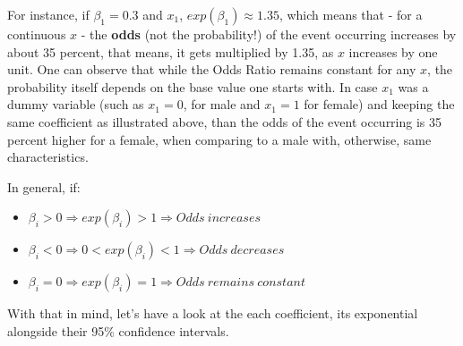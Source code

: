 \documentclass[12,]{article}
\newenvironment{Shaded}{\begin{snugshade}}{\end{snugshade}}
\newcommand{\KeywordTok}[1]{\textcolor[rgb]{0.13,0.29,0.53}{\textbf{#1}}}
\newcommand{\DataTypeTok}[1]{\textcolor[rgb]{0.13,0.29,0.53}{#1}}
\newcommand{\DecValTok}[1]{\textcolor[rgb]{0.00,0.00,0.81}{#1}}
\newcommand{\StringTok}[1]{\textcolor[rgb]{0.31,0.60,0.02}{#1}}
\newcommand{\OperatorTok}[1]{\textcolor[rgb]{0.81,0.36,0.00}{\textbf{#1}}}
\newcommand{\NormalTok}[1]{#1}
\providecommand{\tightlist}{%
  \setlength{\itemsep}{0pt}\setlength{\parskip}{0pt}}
\begin{document}
For instance, if \(\beta_1 = 0.3\) and \(x_1\),
\(exp(\beta_1) \approx 1.35\), which means that - for a continuous \(x\)
- the \textbf{odds} (not the probability!) of the event occurring
increases by about 35 percent, that means, it gets multiplied by 1.35,
as \(x\) increases by one unit. One can observe that while the Odds
Ratio remains constant for any \(x\), the probability itself depends on
the base value one starts with. In case \(x_1\) was a dummy variable
(such as \(x_1 = 0\), for male and \(x_1 = 1\) for female) and keeping
the same coefficient as illustrated above, than the odds of the event
occurring is 35 percent higher for a female, when comparing to a male
with, otherwise, same characteristics.

In general, if:

\begin{itemize}
\tightlist
\item
  \(\beta_i > 0 \Rightarrow exp(\beta_i) > 1 \Rightarrow Odds~increases\)
\item
  \(\beta_i < 0 \Rightarrow 0 < exp(\beta_i) < 1 \Rightarrow Odds~decreases\)
\item
  \(\beta_i = 0 \Rightarrow exp(\beta_i) = 1 \Rightarrow Odds~remains~constant\)
\end{itemize}

With that in mind, let's have a look at the each coefficient, its
exponential alongside their 95\% confidence intervals.

\begin{Shaded}
\end{Shaded}
\end{document}
